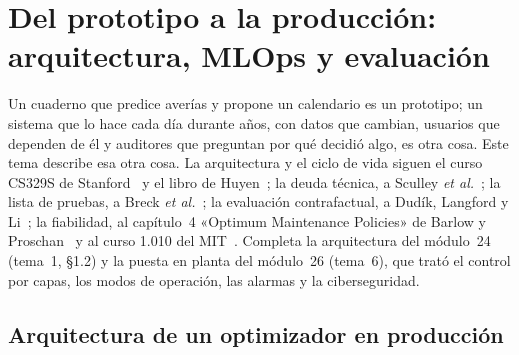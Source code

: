 \chapter{Del prototipo a la producción: arquitectura, MLOps y evaluación}
\label{tema:4}

Un cuaderno que predice averías y propone un calendario es un prototipo; un sistema que lo hace cada día durante años, con datos que cambian, usuarios que dependen de él y auditores que preguntan por qué decidió algo, es otra cosa. Este tema describe esa otra cosa. La arquitectura y el ciclo de vida siguen el curso CS329S de Stanford~\cite{cs329s} y el libro de Huyen~\cite{huyen}; la deuda técnica, a Sculley \emph{et al.}~\cite{sculley}; la lista de pruebas, a Breck \emph{et al.}~\cite{breck}; la evaluación contrafactual, a Dudík, Langford y Li~\cite{dudik}; la fiabilidad, al capítulo~4 «Optimum Maintenance Policies» de Barlow y Proschan~\cite{bp} y al curso 1.010 del MIT~\cite{mit1010}. Completa la arquitectura del módulo~24 (tema~1, §1.2) y la puesta en planta del módulo~26 (tema~6), que trató el control por capas, los modos de operación, las alarmas y la ciberseguridad.

\section{Arquitectura de un optimizador en producción}

\addtocounter{figure}{1}%

